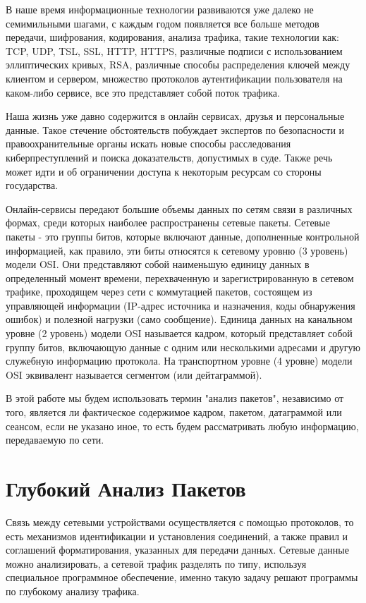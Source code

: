 \documentclass[utf8,14pt,a4paper,oneside,russian]{book}
\begin{document}
В наше время информационные технологии развиваются уже далеко не семимильными шагами, с каждым годом
появляется все больше методов передачи, шифрования, кодирования, анализа трафика, такие технологии как:
TCP, UDP, TSL, SSL, HTTP, HTTPS, различные подписи с использованием эллиптических кривых, RSA, различные
способы распределения ключей между клиентом и сервером, множество протоколов аутентификации пользователя
на каком-либо сервисе, все это представляет собой поток трафика.

Наша жизнь уже давно содержится в онлайн сервисах, друзья и персональные данные.
Такое стечение обстоятельств побуждает экспертов по безопасности и правоохранительные органы искать новые
способы расследования киберпреступлений и поиска доказательств, допустимых в суде. Также речь может идти и
об ограничении доступа к некоторым ресурсам со стороны государства.

Онлайн-сервисы передают большие объемы данных по сетям связи в различных формах, среди которых наиболее распространены
сетевые пакеты. Сетевые пакеты - это группы битов, которые включают данные, дополненные контрольной информацией, как
правило, эти биты относятся к сетевому уровню (3 уровень) модели OSI. Они представляют собой наименьшую единицу данных
в определенный момент времени, перехваченную и зарегистрированную в сетевом трафике, проходящем через сети с коммутацией
пакетов, состоящем из управляющей информации (IP-адрес источника и назначения, коды обнаружения ошибок) и полезной нагрузки
(само сообщение). Единица данных на канальном уровне (2 уровень) модели OSI  называется кадром, который представляет собой
группу битов, включающую данные с одним или несколькими адресами и другую служебную информацию протокола. На транспортном
уровне (4 уровне) модели OSI эквивалент называется сегментом (или дейтаграммой).

В этой работе мы будем использовать термин "анализ пакетов", независимо от того, является ли фактическое содержимое кадром,
пакетом, датаграммой или сеансом, если не указано иное, то есть будем рассматривать любую информацию, передаваемую по сети.


\newpage
\section{Глубокий Анализ Пакетов}

Связь между сетевыми устройствами осуществляется с помощью протоколов, то есть механизмов идентификации и установления соединений,
а также правил и соглашений форматирования, указанных для передачи данных. Сетевые данные можно анализировать, а сетевой трафик разделять
по типу, используя специальное программное обеспечение, именно такую задачу решают программы по глубокому анализу трафика.
\end{document}
